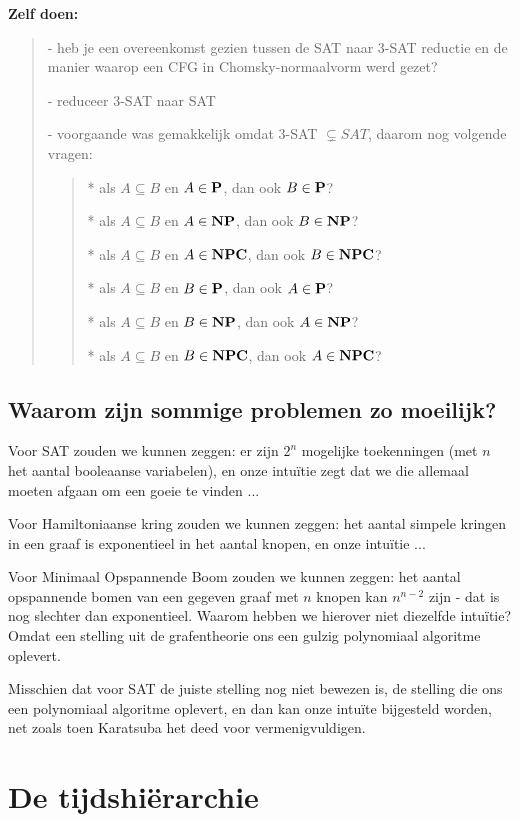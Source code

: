 \newpage
{\bf Zelf doen:} 
\begin{verse}
- heb je een overeenkomst gezien tussen de SAT naar 3-SAT reductie en
de manier waarop een CFG in Chomsky-normaalvorm werd gezet?

- reduceer $3$-SAT naar SAT

- voorgaande was gemakkelijk omdat $3$-SAT $\subsetneq SAT$, daarom nog volgende vragen:

\begin{verse}
* als $A \subseteq B$ en $A \in \P$, dan ook $B \in \P$?

* als $A \subseteq B$ en $A \in \NP$, dan ook $B \in \NP$?

* als $A \subseteq B$ en $A \in \NPC$, dan ook $B \in \NPC$?

* als $A \subseteq B$ en $B \in \P$, dan ook $A \in \P$?

* als $A \subseteq B$ en $B \in \NP$, dan ook $A \in \NP$?

* als $A \subseteq B$ en $B \in \NPC$, dan ook $A \in \NPC$?

\end{verse}
\end{verse}


\subsection{Waarom zijn sommige problemen zo moeilijk?}

Voor SAT zouden we kunnen zeggen: er zijn $2^n$ mogelijke toekenningen
(met $n$ het aantal booleaanse variabelen), en onze intu\"itie zegt dat we
die allemaal moeten afgaan om een goeie te vinden ...

Voor Hamiltoniaanse kring zouden we kunnen zeggen: het aantal simpele
kringen in een graaf is exponentieel in het aantal knopen, en onze intu\"itie ...

Voor Minimaal Opspannende Boom zouden we kunnen zeggen: het aantal
opspannende bomen van een gegeven graaf met $n$ knopen kan $n^{n-2}$
zijn - dat is nog slechter dan exponentieel. Waarom hebben we
hierover niet diezelfde intu\"itie? Omdat een stelling uit de
grafentheorie ons een gulzig polynomiaal algoritme oplevert.

Misschien dat voor SAT de juiste stelling nog niet bewezen is, de
stelling die ons een polynomiaal algoritme oplevert, en dan kan onze
intu\"ite bijgesteld worden, net zoals toen Karatsuba het deed voor
vermenigvuldigen.

\section{De tijdshi\"erarchie}\label{tijdshierarchie}

